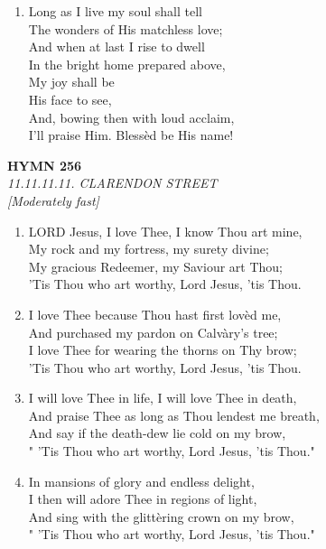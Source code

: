 \begin{enumerate}
    \item Long as I live my soul shall tell \\
        The wonders of His matchless love; \\
        And when at last I rise to dwell \\
        In the bright home prepared above, \\
            My joy shall be \\
            His face to see, \\
        And, bowing then with loud acclaim, \\
        I'll praise Him. Bless\`ed be His name!

\end{enumerate}

\newpage
\begin{center}
    {\Large \textbf{HYMN 256}}
    \\
    \textit{11.11.11.11. CLARENDON STREET}
    \\
    \textit{\small [Moderately fast]}
\end{center}
\vspace{1em}

\begin{enumerate}
    \item LORD Jesus, I love Thee, I know Thou art mine, \\
        My rock and my fortress, my surety divine; \\
        My gracious Redeemer, my Saviour art Thou; \\
        'Tis Thou who art worthy, Lord Jesus, 'tis Thou.

    \item I love Thee because Thou hast first lov\`ed me, \\
        And purchased my pardon on Calv\`ary's tree; \\
        I love Thee for wearing the thorns on Thy brow; \\
        'Tis Thou who art worthy, Lord Jesus, 'tis Thou.

    \item I will love Thee in life, I will love Thee in death, \\
        And praise Thee as long as Thou lendest me breath, \\
        And say if the death-dew lie cold on my brow, \\
        " 'Tis Thou who art worthy, Lord Jesus, 'tis Thou."

    \item In mansions of glory and endless delight, \\
        I then will adore Thee in regions of light, \\
        And sing with the glitt\`ering crown on my brow, \\
        " 'Tis Thou who art worthy, Lord Jesus, 'tis Thou."

\end{enumerate}

